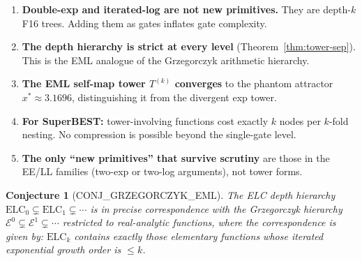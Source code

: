 \documentclass[11pt]{article}
\newtheorem{conjecture}[theorem]{Conjecture}
\begin{document}
\begin{enumerate}
  \item \textbf{Double-exp and iterated-log are not new primitives.}
        They are depth-$k$ F16 trees. Adding them as gates inflates gate complexity.
  \item \textbf{The depth hierarchy is strict at every level} (Theorem~\ref{thm:tower-sep}).
        This is the EML analogue of the Grzegorczyk arithmetic hierarchy.
  \item \textbf{The EML self-map tower $T^{(k)}$ converges} to the phantom attractor
        $x^* \approx 3.1696$, distinguishing it from the divergent exp tower.
  \item \textbf{For SuperBEST:} tower-involving functions cost exactly $k$ nodes
        per $k$-fold nesting. No compression is possible beyond the single-gate level.
  \item \textbf{The only ``new primitives'' that survive scrutiny} are those in the
        EE/LL families (two-exp or two-log arguments), not tower forms.
\end{enumerate}

\begin{conjecture}[CONJ\_GRZEGORCZYK\_EML]
The ELC depth hierarchy $\mathrm{ELC}_0 \subsetneq \mathrm{ELC}_1 \subsetneq \cdots$
is in precise correspondence with the Grzegorczyk hierarchy
$\mathcal{E}^0 \subsetneq \mathcal{E}^1 \subsetneq \cdots$ restricted to
real-analytic functions, where the correspondence is given by:
$\mathrm{ELC}_k$ contains exactly those elementary functions whose
\emph{iterated exponential growth order} is $\leq k$.
\end{conjecture}
\end{document}
